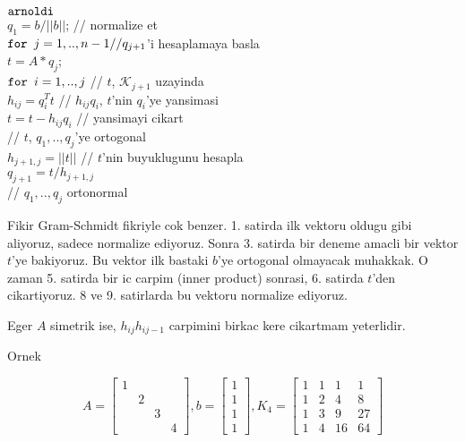 \documentclass[12pt,fleqn]{article}\usepackage{../common}
\begin{document}
\begin{algorithm}[h]
\begin{pseudocode}
\codename $\mbox{\texttt{arnoldi}}$\\
\codeline $q_1 = b / ||b||$; // normalize et\\
\codeline $\mbox{\texttt{for }}j = 1,..,n-1 // q_{j+1}$'i hesaplamaya basla\\
\codeline \> $t = A * q_j$;\\
\codeline \> $\mbox{\texttt{for }}i = 1,..,j $ // $t$, $\mathscr{K}_{j+1}$ uzayinda\\
\codeline \> \>  $h_{ij} = q_i^T t$  // $h_{ij}q_i$, $t$'nin $q_i$'ye yansimasi\\
\codeline \> \>   $t = t - h_{ij}q_i$ // yansimayi cikart \\
\codeline // $t$, $q_1,..,q_j$'ye ortogonal\\
\codeline $h_{j+1,j} = ||t||$ //  $t$'nin buyuklugunu hesapla\\
\codeline $q_{j+1} = t / h_{j+1,j}$\\
\codeline // $q_1,..,q_j$ ortonormal
\end{pseudocode}
\end{algorithm}


Fikir Gram-Schmidt fikriyle cok benzer. 1. satirda ilk vektoru oldugu gibi
aliyoruz, sadece normalize ediyoruz. Sonra 3. satirda bir deneme
amacli bir vektor $t$'ye  bakiyoruz. Bu vektor ilk bastaki $b$'ye ortogonal
olmayacak muhakkak. O zaman 5. satirda bir ic carpim (inner product)
sonrasi, 6. satirda $t$'den cikartiyoruz. 8 ve 9. satirlarda bu
vektoru normalize ediyoruz. 

Eger $A$ simetrik ise, $h_{ij}h_{ij-1}$ carpimini birkac kere cikartmam
yeterlidir. 

Ornek 

\[  
A = 
\left[\begin{array}{rrrr}
1 &&& \\
 & 2 && \\
 && 3 & \\
 &&& 4 
\end{array}\right],
b = 
\left[\begin{array}{r}
1 \\ 1\\ 1 \\ 1
\end{array}\right]
,
K_4 = 
\left[\begin{array}{rrrr}
1 & 1 & 1 & 1\\
1 & 2 & 4 & 8\\
1 & 3 & 9 & 27\\
1 & 4 & 16 & 64 
\end{array}\right]
\]
\end{document}

